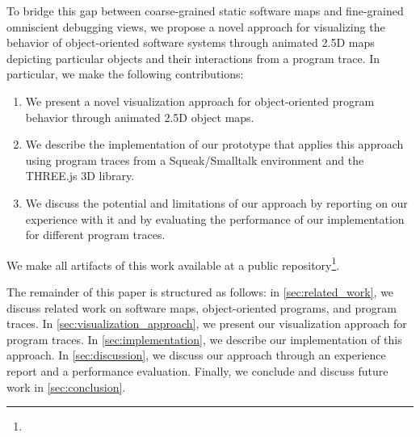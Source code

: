 To bridge this gap between coarse-grained static software maps and fine-grained omniscient debugging views, we propose a novel approach for visualizing the behavior of object-oriented software systems through animated 2.5D maps depicting particular objects and their interactions from a program trace.
In particular, we make the following contributions:

\begin{enumerate}
	\item We present a novel visualization approach for ob\-ject-ori\-ent\-ed program behavior through animated 2.5D object maps.
	\item We describe the implementation of our prototype \tfd{} that applies this approach using program traces from a Squeak/\?Smalltalk environment and the THREE.js 3D library.
	\item We discuss the potential and limitations of our approach by reporting on our experience with it and by evaluating the performance of our implementation for different program traces.
\end{enumerate}

We make all artifacts of this work available at a public repository\footnote{}.

The remainder of this paper is structured as follows:
in \cref{sec:related_work}, we discuss related work on software maps, object-oriented programs, and program traces.
In \cref{sec:visualization_approach}, we present our visualization approach for program traces.
In \cref{sec:implementation}, we describe our implementation of this approach.
In \cref{sec:discussion}, we discuss our approach through an experience report and a performance evaluation.
Finally, we conclude and discuss future work in \cref{sec:conclusion}.
